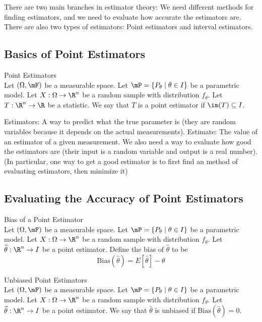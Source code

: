 \documentclass[a4paper]{article}
\begin{document}
There are two main branches in estimator theory: We need different methods for finding estimators, and we need to evaluate how accurate the estimators are. \\

There are also two types of estimators: Point estimators and interval estimators. 

\subsection{Basics of Point Estimators}
\begin{defn}{Point Estimators}{}\\
Let $(\Omega,\mF)$ be a measurable space. Let $\mP=\{P_\theta\;|\;\theta\in I\}$ be a parametric model. Let $X:\Omega\to\R^n$ be a random sample with distribution $f_\theta$. Let $T:\R^n\to\R$ be a statistic. We say that $T$ is a point estimator if $\im(T)\subseteq I$. 
\end{defn}

Estimators: A way to predict what the true parameter is (they are random variables because it depends on the actual measurements). 
Estimate: The value of an estimator of a given measurement. 
We also need a way to evaluate how good the estimators are (their input is a random variable and output is a real number). (In particular, one way to get a good estimator is to first find an method of evaluating estimators, then minimize it)

\subsection{Evaluating the Accuracy of Point Estimators}
\begin{defn}{Bias of a Point Estimator}{}\\
Let $(\Omega,\mF)$ be a measurable space. Let $\mP=\{P_\theta\;|\;\theta\in I\}$ be a parametric model. Let $X:\Omega\to\R^n$ be a random sample with distribution $f_\theta$. Let $\widehat{\theta}:\R^n\to I$ be a point estimator. Define the bias of $\widehat{\theta}$ to be $$\text{Bias}(\widehat{\theta})=E[\widehat{\theta}]-\theta$$
\end{defn}

\begin{defn}{Unbiased Point Estimators}{}\\
Let $(\Omega,\mF)$ be a measurable space. Let $\mP=\{P_\theta\;|\;\theta\in I\}$ be a parametric model. Let $X:\Omega\to\R^n$ be a random sample with distribution $f_\theta$. Let $\widehat{\theta}:\R^n\to I$ be a point estimator. We say that $\widehat{\theta}$ is unbiased if $\text{Bias}(\widehat{\theta})=0$. 
\end{defn}
\end{document}
